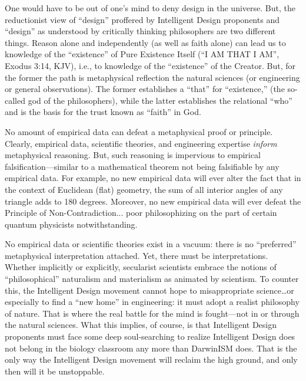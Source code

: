 One would have to be out of one's mind to deny design in the universe. But, the reductionist view of ``design'' proffered by Intelligent Design proponents and ``design'' as understood by critically thinking philosophers are two different things. 
Reason alone and independently (as well as faith alone) can lead us to knowledge of the ``existence'' of Pure Existence Itself (``I AM THAT I AM'', Exodus 3:14, KJV), i.e., to knowledge of the ``existence'' of the Creator. But, for the former the path is  metaphysical reflection  the natural sciences (or engineering or general observations). The former establishes a ``that'' for ``existence,'' (the so-called god of the philosophers), while the latter establishes the relational ``who'' and is the basis for the trust known as ``faith'' in  God.

No amount of empirical data can defeat a metaphysical proof or principle. Clearly, empirical data, scientific theories, and engineering expertise \textit{inform} metaphysical reasoning. But, such reasoning is impervious to empirical falsification—similar to a mathematical theorem not being falsifiable by any empirical data. For example, no new empirical data will ever alter the fact that in the context of Euclidean (flat) geometry, the sum of all interior angles of any triangle adds to 180 degrees. Moreover, no new empirical data will ever defeat the Principle of Non-Contradiction... poor philosophizing on the part of certain quantum physicists notwithstanding.


No empirical data or scientific theories exist in a vacuum: there is no ``preferred'' metaphysical interpretation attached. Yet, there must be interpretations. Whether implicitly or explicitly, secularist scientists embrace the notions of ``philosophical'' naturalism and materialism as animated by scientism. To counter this, the Intelligent Design movement cannot hope to misappropriate science\ldots or especially to find a ``new home'' in engineering: it must adopt a realist philosophy of nature. That is where the real battle for the mind is fought---not in or through the natural sciences. What this implies, of course, is that Intelligent Design proponents must face some deep soul-searching to realize Intelligent Design does not belong in the biology classroom any more than DarwinISM does. That is the only way the Intelligent Design movement will reclaim the high ground, and only then will it be unstoppable.

